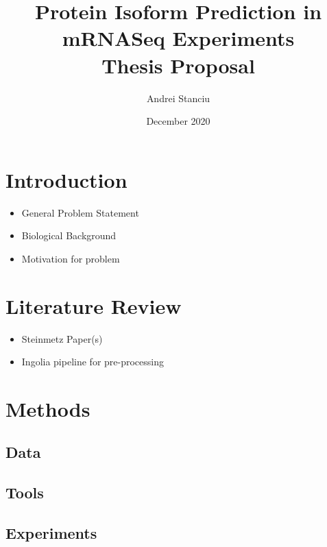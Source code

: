 \documentclass[12pt]{article}
\title{%
    Protein Isoform Prediction in mRNASeq Experiments \\
    \large Thesis Proposal}
\author{Andrei Stanciu}
\date{December 2020}
\begin{document}
\maketitle



\section{Introduction} 
\begin{itemize}
        
    \item General Problem Statement
    \item Biological Background
    \item Motivation for problem
\end{itemize}

\section{Literature Review}\label{literature review}
\begin{itemize}
    \item Steinmetz Paper(s)
    \item Ingolia pipeline for  pre-processing
\end{itemize}

\section{Methods}\label{methods}
\subsection{Data}
\subsection{Tools}\label{tools}
\subsection{Experiments}\label{experiments}



{}

\end{document}
